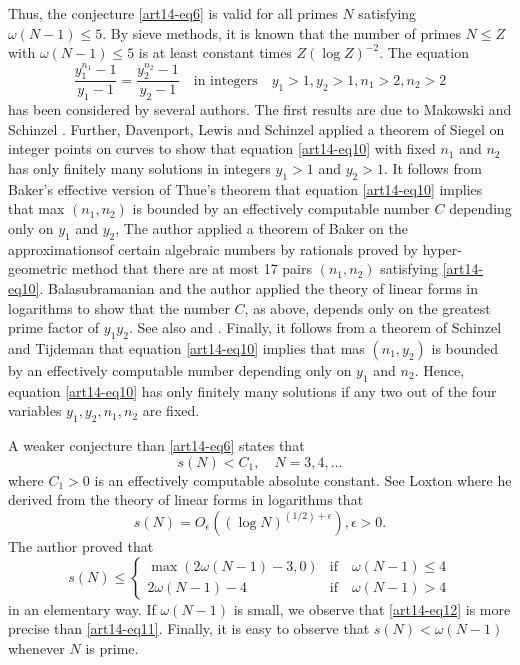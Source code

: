 Thus, the conjecture \eqref{art14-eq6} is valid for all primes $N$ satisfying $\omega(N-1)\leq 5$. By sieve methods, it is known that the number of primes $N\leq Z$ with $\omega(N-1)\leq 5$ is at least constant times $Z(\log Z)^{-2}$. The equation
\begin{equation}
\frac{y^{n_{1}}_{1}-1}{y_{1}-1}=\frac{y^{n_{2}}_{2}-1}{y_{2}-1}\quad\text{in integers~~ } y_{1}>1, y_{2}>1, n_{1}>2, n_{2}>2\label{art14-eq10}
\end{equation}
has been considered by several authors. The first results are due to Makowski and Schinzel \cite{art14-key14}. Further, Davenport, Lewis and Schinzel \cite{art14-key6} applied a theorem of Siegel on integer points on curves to show that equation \eqref{art14-eq10} with fixed $n_{1}$ and $n_{2}$ has only finitely many solutions in integers $y_{1}>1$ and $y_{2}>1$. It follows from Baker's effective version \cite{art14-key2} of Thue's theorem \cite{art14-key36} that equation \eqref{art14-eq10} implies that max $(n_{1},n_{2})$ is bounded by an effectively computable number $C$ depending only on $y_{1}$ and $y_{2}$, The author \cite{art14-key26} applied a theorem of Baker \cite{art14-key1} on the approximations\pageoriginale of certain algebraic numbers by rationals proved by hyper-geometric method that there are at most 17 pairs $(n_{1},n_{2})$ satisfying \eqref{art14-eq10}. Balasubramanian and the author \cite{art14-key4} applied the theory of linear forms in logarithms to show that the number $C$, as above, depends only on the greatest prime factor of $y_{1}y_{2}$. See also \cite{art14-key23} and \cite{art14-key27}. Finally, it follows from a theorem of Schinzel and Tijdeman \cite{art14-key22} that equation \eqref{art14-eq10} implies that mas $(n_{1},y_{2})$ is bounded by an effectively computable number depending only on $y_{1}$ and $n_{2}$. Hence, equation \eqref{art14-eq10} has only finitely many solutions if any two out of the four variables $y_{1},y_{2},n_{1},n_{2}$ are fixed.

A weaker conjecture than \eqref{art14-eq6} states that
$$
s(N)<C_{1},\quad N=3,4,\ldots
$$
where $C_{1}>0$ is an effectively computable absolute constant. See Loxton \cite{art14-key13} where he derived from the theory of linear forms in logarithms that
\begin{equation}
s(N)=O_{\epsilon}((\log N)^{(1/2)+\epsilon}),\epsilon>0.\label{art14-eq11}
\end{equation}
The author \cite{art14-key29} proved that
\begin{equation}
s(N)\leq 
\begin{cases}
\max (2\omega(N-1)-3,0) & \text{if~~ }\omega(N-1)\leq 4\\
2\omega(N-1)-4 & \text{if~~ } \omega(N-1)>4
\end{cases}\label{art14-eq12}
\end{equation}
in an elementary way. If $\omega(N-1)$ is small, we observe that \eqref{art14-eq12} is more precise than \eqref{art14-eq11}. Finally, it is easy to observe that $s(N)<\omega(N-1)$ whenever $N$ is prime.

